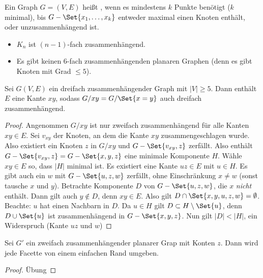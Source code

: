 \begin{df}
    Ein Graph $G = (V, E)$ heißt , wenn es mindestens $k$ Punkte benötigt ($k$ minimal), bis $G - \Set{x_1, \dotsc, x_k}$ entweder maximal einen Knoten enthält, oder unzusammenhängend ist.
\end{df}


\begin{nt}
    \begin{itemize}
        \item
            $K_n$ ist $(n-1)$-fach zusammenhängend.
        \item
            Es gibt keinen $6$-fach zusammenhängenden planaren Graphen (denn es gibt Knoten mit Grad $\le 5$).
    \end{itemize}
\end{nt}

\begin{st}[Thomassen, 1980]
    Sei $G(V, E)$ ein dreifach zusammenhängender Graph mit $|V| \ge 5$.
    Dann enthält $E$ eine Kante $xy$, sodass $G / xy = G / \Set{x=y}$ auch dreifach zusammenhängend.
    \begin{proof}
        Angenommen $G / xy$ ist nur zweifach zusammenhängend für alle Kanten $xy \in E$.
        Sei $v_{xy}$ der Knoten, an dem die Kante $xy$ zusammengeschlagen wurde.
        Also existiert ein Knoten $z$ in $G / xy$ und $G - \Set{v_{xy}, z}$ zerfällt.
        Also enthält $G - \Set{v_{xy}, z} = G - \Set{x,y,z}$ eine minimale Komponente $H$.
        Wähle $xy \in E$ so, dass $|H|$ minimal ist.
        Es existiert eine Kante $uz \in E$ mit $u \in H$.
        Es gibt auch ein $w$ mit $G - \Set{u,z,w}$ zerfällt, ohne Einschränkung $x \neq w$ (sonst tausche $x$ und $y$).
        Betrachte Komponente $D$ von $G - \Set{u,z,w}$, die $x$ \emph{nicht} enthält.
        Dann gilt auch $y \not\in D$, denn $xy \in E$.
        Also gilt $D \cap \Set{x,y,u,z,w} = \emptyset$.
        Beachte: $u$ hat einen Nachbarn in $D$.
        Da $u \in H$ gilt $D \subset H \setminus \Set{u}$, denn $D \cup \Set{u}$ ist zusammenhängend in $G - \Set{x,y,z}$.
        Nun gilt $|D| < |H|$, ein Widerspruch (Kante $uz$ und $w$)
    \end{proof}
\end{st}

\begin{lem}
    Sei $G'$ ein zweifach zusammenhängender planarer Grap mit Konten $z$.
    Dann wird jede Facette von einem einfachen Rand umgeben.
    \begin{proof}
        Übung
    \end{proof}
\end{lem}


